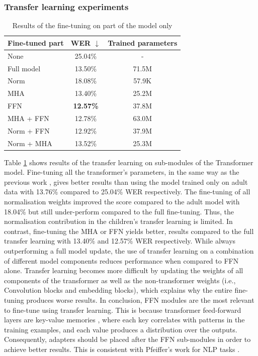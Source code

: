 \subsubsection{Transfer learning experiments}
\begin{table}[ht]
\centering
\begin{tabular}{lcc} \toprule
Fine-tuned part & WER $\downarrow$  & Trained parameters\\\hline
None & 25.04\% & - \\
Full model & 13.50\% & 71.5M\\ \hline
Norm & 18.08\% & 57.9K\\
MHA & 13.40\% & 25.2M \\
FFN & \textbf{12.57\%} & 37.8M \\ \hline
MHA + FFN & 12.78\%  & 63.0M\\
Norm + FFN & 12.92\% & 37.9M \\
Norm + MHA & 13.52\%  & 25.3M\\ \hline
\end{tabular}
\caption{Results of the fine-tuning on part of the model only}
\label{tab:result_TL_transformer}
\end{table}
Table \ref{tab:result_TL_transformer} shows results of the transfer learning on sub-modules of the Transformer model. Fine-tuning all the transformer's parameters, in the same way as the previous work \cite{sri_end2end,gelin2021endtoend}, gives better results than using the model trained only on adult data with 13.76\% compared to 25.04\% WER respectively. The fine-tuning of all normalisation weights improved the score compared to the adult model with 18.04\% but still under-perform compared to the full fine-tuning. Thus, the normalisation contribution in the children's transfer learning is limited. In contrast, fine-tuning the MHA or FFN yields better, results compared to the full transfer learning with 13.40\% and 12.57\% WER respectively. While always outperforming a full model update, the use of transfer learning on a combination of different model components reduces performance when compared to FFN alone. Transfer learning becomes more difficult by updating the weights of all components of the transformer as well as the non-transformer weights (i.e., Convolution blocks and embedding blocks), which explains why the entire fine-tuning produces worse results. In conclusion, FFN modules are the most relevant to fine-tune using transfer learning. This is because transformer feed-forward layers are key-value memories \cite{geva2020transformer}, where each key correlates with patterns in the training examples, and each value produces a distribution over the outputs. Consequently, adapters should be placed after the FFN sub-modules in order to achieve better results. This is consistent with Pfeiffer's work for NLP tasks \cite{pfeiffer}.


